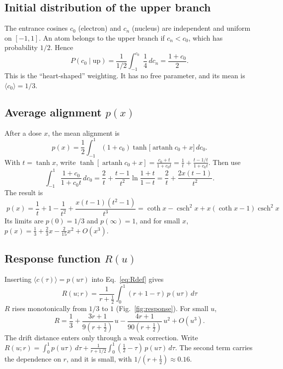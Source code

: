 \documentclass[11pt,a4paper]{article}
\newcommand{\artanh}{\operatorname{artanh}}
\newcommand{\csch}{\operatorname{csch}}
\begin{document}
\subsection{Initial distribution of the upper branch}
The entrance cosines $c_0$ (electron) and $c_n$ (nucleus) are independent and uniform on $[-1,1]$. An atom belongs to the upper branch if $c_n<c_0$, which has probability $1/2$. Hence
\begin{equation}
P(c_0\mid\text{up}) = \frac{1}{1/2}\int_{-1}^{c_0}\frac14\,dc_n = \frac{1+c_0}{2}.
\label{eq:heart}
\end{equation}
This is the ``heart-shaped'' weighting. It has no free parameter, and its mean is $\langle c_0\rangle = 1/3$.

\subsection{Average alignment $p(x)$}
After a dose $x$, the mean alignment is
\begin{equation}
p(x) = \frac12\int_{-1}^1 (1+c_0)\tanh\!\big[\artanh c_0 + x\big]\,dc_0 .
\label{eq:pint}
\end{equation}
With $t=\tanh x$, write $\tanh[\artanh c_0+x] = \frac{c_0+t}{1+c_0t} = \frac1t + \frac{t-1/t}{1+c_0t}$. Then use
\[
\int_{-1}^1\frac{1+c_0}{1+c_0t}\,dc_0 = \frac2t + \frac{t-1}{t^2}\ln\frac{1+t}{1-t} = \frac2t + \frac{2x(t-1)}{t^2}.
\]
The result is
\begin{equation}
\boxed{\;p(x) = \frac1t + 1 - \frac1{t^2} + \frac{x(t-1)(t^2-1)}{t^3}
= \coth x - \csch^2x + x(\coth x-1)\csch^2 x\;}
\label{eq:pclosed}
\end{equation}
Its limits are $p(0)=1/3$ and $p(\infty)=1$, and for small $x$, $p(x) = \frac13 + \frac23x - \frac2{15}x^2 + O(x^3)$.

\subsection{Response function $R(u)$}
Inserting $\langle c(\tau)\rangle = p(u\tau)$ into Eq.~\eqref{eq:Rdef} gives
\begin{equation}
\boxed{\;R(u;r) = \frac{1}{r+\frac12}\int_0^1(r+1-\tau)\,p(u\tau)\,d\tau\;}
\label{eq:R}
\end{equation}
$R$ rises monotonically from $1/3$ to $1$ (Fig.~\ref{fig:response}). For small $u$,
\begin{equation}
R = \frac13 + \frac{3r+1}{9(r+\frac12)}\,u - \frac{4r+1}{90(r+\frac12)}\,u^2 + O(u^3).
\end{equation}
The drift distance enters only through a weak correction. Write $R(u;r) = \int_0^1 p(u\tau)\,d\tau + \frac{1}{r+1/2}\int_0^1(\frac12-\tau)\,p(u\tau)\,d\tau$. The second term carries the dependence on $r$, and it is small, with $1/(r+\frac12)\approx 0.16$.
\end{document}
